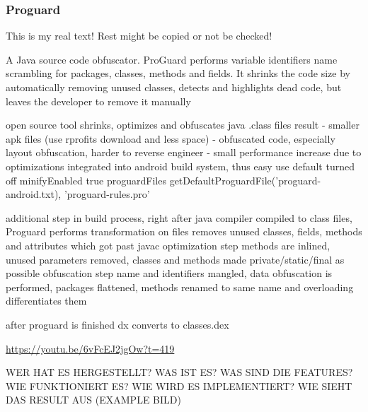 \subsubsection{Proguard} \label{subsubsection:counter-reengineering-optobf-proguard}
This is my real text! Rest might be copied or not be checked!


%
A Java source code obfuscator. ProGuard performs variable identifiers name scrambling for packages, classes, methods and fields. It shrinks the code size by automatically removing unused classes, detects and highlights dead code, but leaves the developer to remove it manually
\cite{kovachevaMaster}
%

%
open source tool
shrinks, optimizes and obfuscates java .class files
result
- smaller apk files (use rprofits download and less space)
- obfuscated code, especially layout obfuscation, harder to reverse engineer
- small performance increase due to optimizations
integrated into android build system, thus easy use
default turned off
minifyEnabled true
proguardFiles getDefaultProguardFile('proguard-android.txt), 'proguard-rules.pro'

additional step in build process, right after java compiler compiled to class files, Proguard performs transformation on files
removes unused classes, fields, methods and attributes which got past javac
optimization step methods are inlined, unused parameters removed, classes and methods made private/static/final as possible
obfuscation step name and identifiers mangled, data obfuscation is performed, packages flattened, methods renamed to same name and overloading differentiates them

after proguard is finished dx converts to classes.dex

\cite{munteanLicense}
%



\url{https://youtu.be/6vFcEJ2jgOw?t=419}\newline

WER HAT ES HERGESTELLT? WAS IST ES? WAS SIND DIE FEATURES? WIE FUNKTIONIERT ES? WIE WIRD ES IMPLEMENTIERT? WIE SIEHT DAS RESULT AUS (EXAMPLE BILD)\newline


